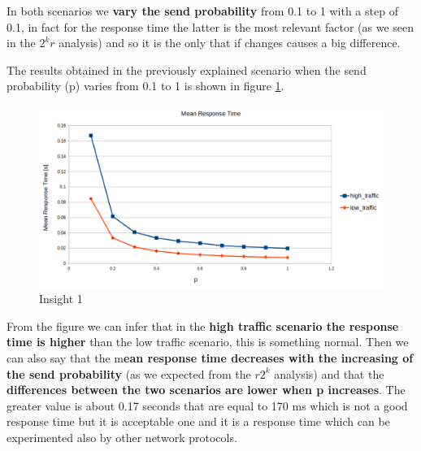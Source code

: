 \noindent In both scenarios we \textbf{vary the send probability} from 0.1 to 1 with a step of 0.1, in fact for the response time the latter is the most relevant factor (as we seen in the $2^kr$ analysis) and so it is the only that if changes causes a big difference.

\noindent The results obtained in the previously explained scenario when the send probability (p) varies from 0.1 to 1 is shown in figure \ref{img: insight1_respTime}.
\begin{figure}[H]
	\centering
	\includegraphics[width=\textwidth]{img/MeanResponseTimeInsight.png}
	\caption{Insight 1}
	\label{img: insight1_respTime}
\end{figure}

\noindent From the figure we can infer that in the \textbf{high traffic scenario the response time is higher} than the low traffic scenario, this is something normal. Then we can also say that the m\textbf{ean response time decreases with the increasing of the send probability} (as we expected from the $r2^k$ analysis) and that the \textbf{differences between the two scenarios are lower when p increases}. The greater value is about 0.17 seconds that are equal to 170 ms which is not a good response time but it is acceptable one and it is a response time which can be experimented also by other network protocols.




